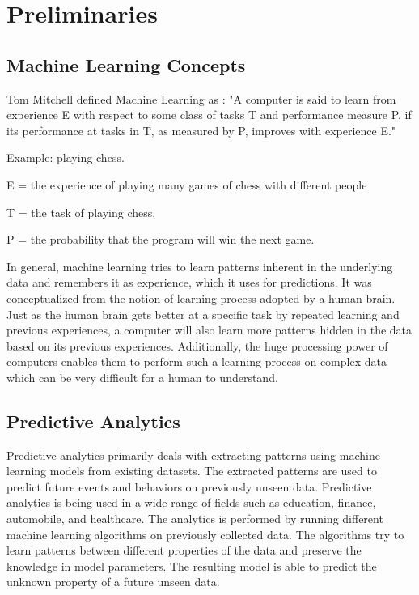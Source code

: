 \documentclass[11pt,openright]{report}
\begin{document}
\section{Preliminaries}\label{section:preliminaries}

\subsection{Machine Learning Concepts}

\noindent  Tom Mitchell defined Machine Learning as \cite{Mitchell1997}: 
\newline\newline
\hangindent=0.7cm "A computer is said to learn from experience E with respect to some class of tasks T and performance measure P, if its performance at tasks in T, as measured by P, improves with experience E." \newline 

\noindent Example: playing chess.

\noindent E = the experience of playing many games of chess with different people

\noindent T = the task of playing chess.

\noindent P = the probability that the program will win the next game.\newline 

\noindent In general, machine learning tries to learn patterns inherent in the underlying data and remembers it as experience, which it uses for predictions. It was conceptualized from the notion of learning process adopted by a human brain. Just as the human brain gets better at a specific task by repeated learning and previous experiences, a computer will also learn more patterns hidden in the data based on its previous experiences. Additionally, the huge processing power of computers enables them to perform such a learning process on complex data which can be very difficult for a human to understand. 

\subsection{Predictive Analytics}
Predictive analytics primarily deals with extracting patterns using machine learning models from existing datasets. The extracted patterns are used to predict future events and behaviors on previously unseen data. Predictive analytics is being used in a wide range of fields such as education, finance, automobile, and healthcare. The analytics is performed by running different machine learning algorithms on previously collected data. The algorithms try to learn patterns between different properties of the data and preserve the knowledge in model parameters. The resulting model is able to predict the unknown property of a future unseen data. 
\end{document}

